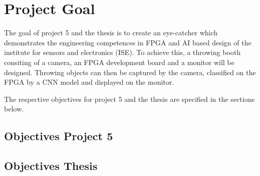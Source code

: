 \section{Project Goal}
\label{sec:project_goal}
The goal of project 5 and the thesis is to create an eye-catcher which demonstrates the engineering competences in FPGA and AI based design of the institute for sensors and electronics (ISE). To achieve this, a throwing booth consiting of a camera, an FPGA development board and a monitor will be designed. Throwing objects can then be captured by the camera, classified on the FPGA by a CNN model and displayed on the monitor.

The respective objectives for project 5 and the thesis are specified in the sections below.

\subsection{Objectives Project 5}
\label{subsec:objectives_project_5}


\subsection{Objectives Thesis}
\label{subsec:objectives_thesis}

